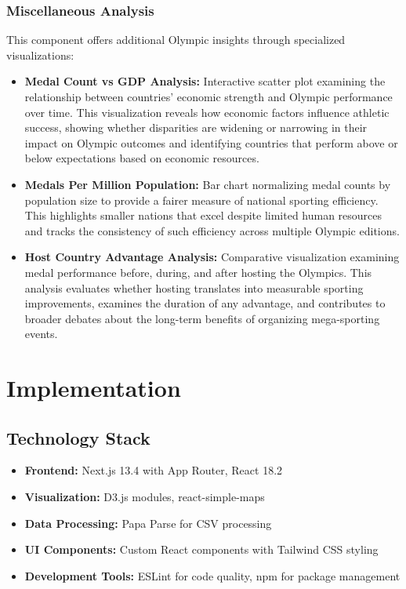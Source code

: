 \documentclass[a4paper, 12pt]{article}
\begin{document}
\subsubsection{Miscellaneous Analysis}
This component offers additional Olympic insights through specialized visualizations:

\begin{itemize}[leftmargin=*]
    \item \textbf{Medal Count vs GDP Analysis:} Interactive scatter plot examining the relationship between countries' economic strength and Olympic performance over time. This visualization reveals how economic factors influence athletic success, showing whether disparities are widening or narrowing in their impact on Olympic outcomes and identifying countries that perform above or below expectations based on economic resources.
    
    \item \textbf{Medals Per Million Population:} Bar chart normalizing medal counts by population size to provide a fairer measure of national sporting efficiency. This highlights smaller nations that excel despite limited human resources and tracks the consistency of such efficiency across multiple Olympic editions.
    
    \item \textbf{Host Country Advantage Analysis:} Comparative visualization examining medal performance before, during, and after hosting the Olympics. This analysis evaluates whether hosting translates into measurable sporting improvements, examines the duration of any advantage, and contributes to broader debates about the long-term benefits of organizing mega-sporting events.
\end{itemize}

\section{Implementation}
\subsection{Technology Stack}
\begin{itemize}[leftmargin=*]
    \item \textbf{Frontend:} Next.js 13.4 with App Router, React 18.2
    \item \textbf{Visualization:} D3.js modules, react-simple-maps
    \item \textbf{Data Processing:} Papa Parse for CSV processing
    \item \textbf{UI Components:} Custom React components with Tailwind CSS styling
    \item \textbf{Development Tools:} ESLint for code quality, npm for package management
\end{itemize}
\end{document}
